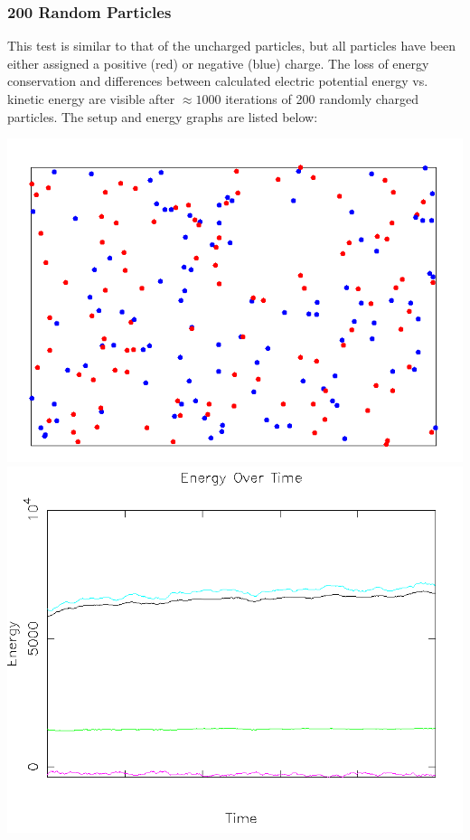 \documentclass{article}
\begin{document}
\subsubsection{200 Random Particles}
This test is similar to that of the uncharged particles,
but all particles have been either assigned a positive (red) or negative (blue) charge.
The loss of energy conservation and differences between calculated electric potential energy
vs. kinetic energy are visible after $\approx 1000$ iterations of 200 randomly charged particles.
The setup and energy graphs are listed below:
\\
\begin{center}
    \includegraphics[scale=0.5]{charged_random}
    \includegraphics[scale=0.5]{charged_random_energy}
\end{center}
\end{document}
